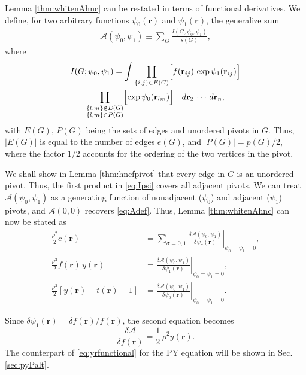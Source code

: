 \documentclass[preprint]{revtex4-1}
\newcommand{\vct}[1]{\mathbf{#1}}
\providecommand{\vr}{} %
\renewcommand{\vr}{\vct{r}}
\newcommand{\A}{\mathcal{A}}
\begin{document}
Lemma \ref{thm:whitenAhnc} can be
restated in terms of functional derivatives.
%
We define, for two arbitrary functions $\psi_0(\vr)$ and $\psi_1(\vr)$,
the generalize sum
\begin{align}
  \A(\psi_0, \psi_1)
\equiv
  \sum_G \frac{ I(G; \psi_0, \psi_1) } { s(G) },
\label{eq:Apsi}
\end{align}
where
\begin{multline}
  I(G; \psi_0, \psi_1)
=
  \int
    \prod_{\{i, j\} \in E(G)}
    \Bigl[
      f(\vr_{ij}) \, \exp \psi_1(\vr_{ij})
    \Bigr]
  \\
    \prod_{
      \substack{
        \{l, m\} \notin E(G) \\
        \{l, m\} \in P(G)
      }
    }
    \Bigl[
      \exp \psi_0(\vr_{lm})
    \Bigr]
  \quad
  d\vr_2 \, \cdots \, d\vr_n,
  \label{eq:Ipsi}
\end{multline}
with $E(G)$, $P(G)$ being the sets of edges and unordered pivots in $G$.
%
Thus, $|E(G)|$ is equal to the number of edges $e(G)$,
and $|P(G)| = p(G)/2$,
where the factor $1/2$ accounts for the ordering
of the two vertices in the pivot.



We shall show in Lemma \ref{thm:hncfpivot} that
every edge in $G$ is an unordered pivot.
%
Thus,
the first product in \eqref{eq:Ipsi}
covers all adjacent pivots.
%
We can treat
$\A(\psi_0, \psi_1)$
as a generating function
of nonadjacent ($\psi_0$) and adjacent ($\psi_1$) pivots,
%
and $\A(0,0)$ recovers \eqref{eq:Adef}.
%
Thus, Lemma \ref{thm:whitenAhnc} can now be stated as
\begin{align*}
  \frac{\rho^2}{2} c(\vr)
&=
  \left.
  \sum_{\sigma = 0, 1}
  \frac{ \delta \A(\psi_0, \psi_1) } { \delta \psi_\sigma(\vr) }
  \right|_{\psi_0 = \psi_1 = 0},
\\
%
%
%
  \frac{\rho^2}{2} f(\vr) \, y(\vr)
&=
  \left.
  \frac{ \delta \A(\psi_0, \psi_1) } { \delta \psi_1(\vr) }
  \right|_{\psi_0 = \psi_1 = 0},
\\
%
%
%
  \frac{\rho^2}{2}[ y(\vr) - t(\vr) - 1 ]
&=
  \left.
  \frac{ \delta \A(\psi_0, \psi_1) } { \delta \psi_0(\vr) }
  \right|_{\psi_0 = \psi_1 = 0}.
\end{align*}

Since $\delta \psi_1(\vr) = \delta f(\vr)/ f(\vr)$,
the second equation becomes
\begin{equation}
  \frac{ \delta \A } { \delta f(\vr) }
  = \frac{1}{2} \, \rho^2 y(\vr).
  \label{eq:yrfunctional}
\end{equation}
The counterpart of \eqref{eq:yrfunctional} for the PY equation
will be shown in Sec. \ref{sec:pyPalt}.
\end{document}
